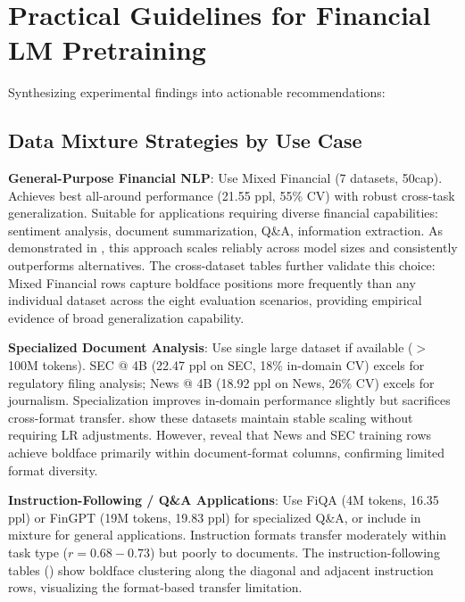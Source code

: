 \section{Practical Guidelines for Financial LM Pretraining}

Synthesizing experimental findings into actionable recommendations:

\subsection{Data Mixture Strategies by Use Case}

\textbf{General-Purpose Financial NLP}: Use Mixed Financial (7 datasets, 50cap). Achieves best all-around performance (21.55 ppl, 55\% CV) with robust cross-task generalization. Suitable for applications requiring diverse financial capabilities: sentiment analysis, document summarization, Q\&A, information extraction. As demonstrated in , this approach scales reliably across model sizes and consistently outperforms alternatives. The cross-dataset tables further validate this choice: Mixed Financial rows capture boldface positions more frequently than any individual dataset across the eight evaluation scenarios, providing empirical evidence of broad generalization capability.

\textbf{Specialized Document Analysis}: Use single large dataset if available ($>$ 100M tokens). SEC @ 4B (22.47 ppl on SEC, 18\% in-domain CV) excels for regulatory filing analysis; News @ 4B (18.92 ppl on News, 26\% CV) excels for journalism. Specialization improves in-domain performance slightly but sacrifices cross-format transfer.  show these datasets maintain stable scaling without requiring LR adjustments. However,  reveal that News and SEC training rows achieve boldface primarily within document-format columns, confirming limited format diversity.

\textbf{Instruction-Following / Q\&A Applications}: Use FiQA (4M tokens, 16.35 ppl) or FinGPT (19M tokens, 19.83 ppl) for specialized Q\&A, or include in mixture for general applications. Instruction formats transfer moderately within task type ($r = 0.68-0.73$) but poorly to documents. The instruction-following tables () show boldface clustering along the diagonal and adjacent instruction rows, visualizing the format-based transfer limitation.

